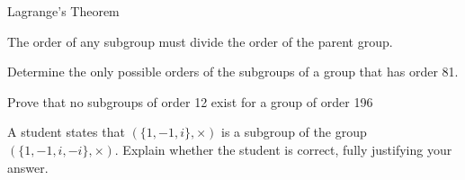 \documentclass[8pt]{beamer}
\begin{document}
\begin{frame}{Lagrange's Theorem}
	\begin{Theorem}
		The order of any subgroup must divide the order of the parent group.
		

	\end{Theorem}
	\begin{Problem}
		Determine the only possible orders of the subgroups of a group that has order 81.
		
	\end{Problem}

\begin{Problem}
	Prove that no subgroups of order 12 exist for a group of order 196
	
\end{Problem}


\begin{Problem}
	A student states that $(\{1,-1,i\},\times)$ is a subgroup of the group  $(\{1,-1,i,-i\},\times)$. Explain whether the student is correct, fully justifying your answer.
	
\end{Problem}




\end{frame}
\end{document}
